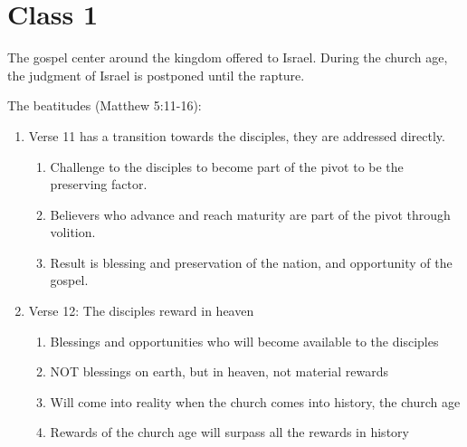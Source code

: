 \documentclass[11pt]{article}
\begin{document}
\maketitle

\section*{Class 1}
The gospel center around the kingdom offered to Israel. During the church age, the judgment of Israel is postponed until the rapture.

The beatitudes (Matthew 5:11-16):

\begin{enumerate}
	\item Verse 11 has a transition towards the disciples, they are addressed directly.
	\begin{enumerate}
		\item Challenge to the disciples to become part of the pivot to be the preserving factor.
		\item Believers who advance and reach maturity are part of the pivot through volition.
		\item Result is blessing and preservation of the nation, and opportunity of the gospel.
	\end{enumerate}

	\item Verse 12: The disciples reward in heaven
	\begin{enumerate}
		\item Blessings and opportunities who will become available to the disciples
		\item NOT blessings on earth, but in heaven, not material rewards
		\item Will come into reality when the church comes into history, the church age
		\item Rewards of the church age will surpass all the rewards in history
	\end{enumerate}


\end{enumerate}
\end{document}
